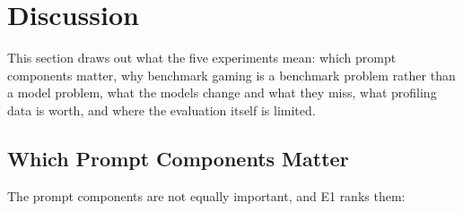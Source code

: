 \section{Discussion}
\label{sec:discussion}
This section draws out what the five experiments mean: which prompt components matter, why benchmark
gaming is a benchmark problem rather than a model problem, what the models change and what they miss,
what profiling data is worth, and where the evaluation itself is limited.

\subsection{Which Prompt Components Matter}
\label{sec:analysis}
The prompt components are not equally important, and E1 ranks them:
